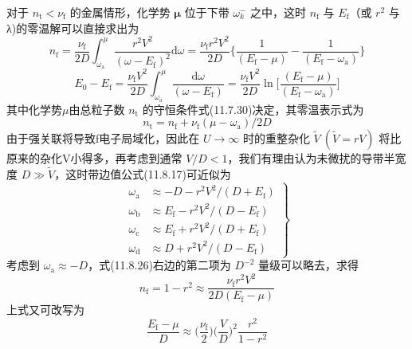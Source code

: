 对于 $n_{\mathrm{t}}<\nu_{\mathrm{f}}$ 的金属情形，化学势 $\boldsymbol{\mu}$ 位于下带 $\omega_{k}^{-}$ 之中，这时 $n_{\mathrm{f}}$ 与 $E_{\mathrm{f}}$（或 $r^{2}$ 与λ)的零温解可以直接求出为
\begin{equation}
  n_{\mathrm{f}}=\frac{\nu_{\mathrm{f}}}{2D}\int_{\omega_{\mathrm{a}}}^{\mu}
  \frac{r^{2}V^{2}}{(\omega-E_{\mathrm{f}})^{2}}\mathrm{d}\omega
  =\frac{\nu_{\mathrm{f}}r^{2}V^{2}}{2D}\biggl\{\frac{1}{(E_{\mathrm{f}}-\mu)}-\frac{1}{(E_{\mathrm{f}}-\omega_{\mathrm{a}})}\biggr\}
\end{equation}
\begin{equation}
  E_{0}-E_{\mathrm{f}}=\frac{\nu_{\mathrm{f}}V^{2}}{2D}\int_{\omega_{\mathrm{a}}}^{\mu}
  \frac{\mathrm{d}\omega}{(\omega-E_{\mathrm{f}})}
  =\frac{\nu_{\mathrm{f}}V^{2}}{2D}\ln\biggl[\frac{(E_{\mathrm{f}}-\mu)}{(E_{\mathrm{f}}-\omega_{\mathrm{a}})}\biggr]
\end{equation}
其中化学势$\mu$由总粒子数 $n_{\mathrm{t}}$ 的守恒条件式(11.7.30)决定，其零温表示式为
\begin{equation}
  n_{\mathrm{t}}=n_{\mathrm{f}}+\nu_{\mathrm{f}}(\mu-\omega_{\mathrm{a}})/2D
\end{equation}
由于强关联将导致f电子局域化，因此在 $U\to\infty$ 时的重整杂化 $\widetilde{V}\ (\widetilde{V}=rV)$ 将比原来的杂化V小得多，再考虑到通常 $V/D<1$，我们有理由认为未微扰的导带半宽度 $D\gg\widetilde{V}$，这时带边值公式(11.8.17)可近似为
\begin{equation}
\left.\begin{aligned}
  \omega_{\mathrm{a}}&\approx-D-r^{2}V^{2}/(D+E_{\mathrm{f}})\\
  \omega_{\mathrm{b}}&\approx E_{\mathrm{f}}-r^{2}V^{2}/(D-E_{\mathrm{f}})\\
  \omega_{\mathrm{c}}&\approx E_{\mathrm{f}}+r^{2}V^{2}/(D+E_{\mathrm{f}})\\
  \omega_{\mathrm{d}}&\approx D+r^{2}V^{2}/(D-E_{\mathrm{f}})
\end{aligned}\right\}
\end{equation}
考虑到 $\omega_{\mathrm{a}}\approx-D$，式(11.8.26)右边的第二项为 $D^{-2}$ 量级可以略去，求得
\begin{equation}
  n_{\mathrm{f}}=1-r^{2}\approx\frac{\nu_{\mathrm{f}}r^{2}V^{2}}{2D(E_{\mathrm{f}}-\mu)}
\end{equation}
上式又可改写为
\begin{equation}
  \frac{E_{\mathrm{f}}-\mu}{D}\approx\biggl(\frac{\nu_{\mathrm{f}}}{2}\biggr)\biggl(\frac{V}{D}\biggr)^{2}\frac{r^{2}}{1-r^{2}}
\end{equation}
